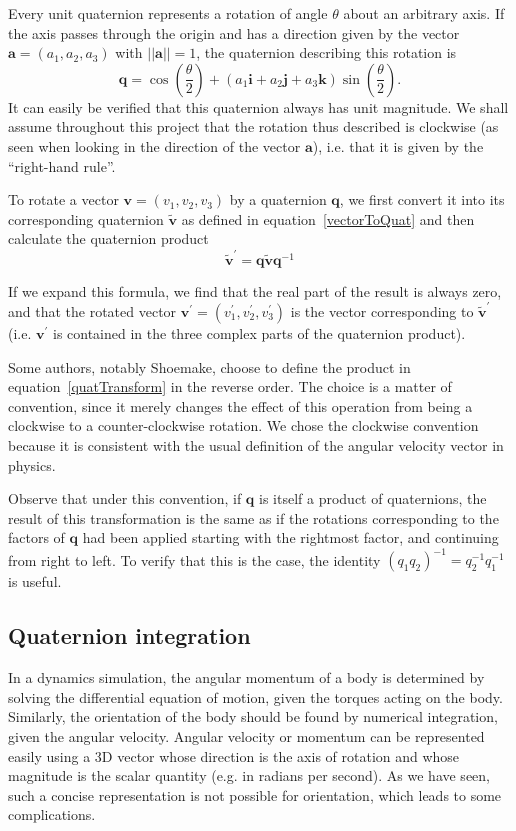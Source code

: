 Every unit quaternion represents a rotation of angle $\theta$ about an arbitrary axis.
If the axis passes through the origin and has a direction given by the vector
$\mathbf{a} = (a_1, a_2, a_3)$ with $||\mathbf{a}|| = 1$, the quaternion describing this rotation is
\begin{equation}
\label{quatRotation}
\mathbf{q} = \cos\left(\frac{\theta}{2}\right) + (a_1\mathbf{i} + a_2\mathbf{j} +
    a_3\mathbf{k}) \sin\left(\frac{\theta}{2}\right).
\end{equation}
It can easily be verified that this quaternion always has unit magnitude.
We shall assume throughout this project that the rotation thus described is clockwise (as seen
when looking in the direction of the vector $\mathbf{a}$), i.e. that it is given by the
``right-hand rule''.

To rotate a vector $\mathbf{v} = (v_1, v_2, v_3)$ by a quaternion $\mathbf{q}$, we first
convert it into its corresponding quaternion $\tilde{\mathbf{v}}$ as defined in
equation~\ref{vectorToQuat} and then calculate the quaternion product
\begin{equation}
\label{quatTransform}
\tilde{\mathbf{v}}^\prime = \mathbf{q}\tilde{\mathbf{v}}\mathbf{q}^{-1}
\end{equation}

If we expand this formula, we find that the real part of the result is always zero, and
that the rotated vector $\mathbf{v}^\prime = (v_1^\prime, v_2^\prime, v_3^\prime)$ is
the vector corresponding to $\tilde{\mathbf{v}}^\prime$ (i.e. $\mathbf{v}^\prime$ is
contained in the three complex parts of the quaternion product).

Some authors, notably Shoemake, choose to define the product in equation~\ref{quatTransform} in
the reverse order. The choice is a matter of convention, since it merely changes the effect
of this operation from being a clockwise to a counter-clockwise rotation. We chose the clockwise
convention because it is consistent with the usual definition of the angular velocity vector
in physics.

Observe that under this convention, if $\mathbf{q}$ is itself a product of quaternions, the
result of this transformation is the same as if the rotations corresponding to the factors
of $\mathbf{q}$ had been applied starting with the rightmost factor, and continuing from
right to left. To verify that this is the case, the identity
$(q_1 q_2)^{-1} = q_2^{-1} q_1^{-1}$ is useful.

\subsection{Quaternion integration}
In a dynamics simulation, the angular momentum of a body is determined by solving the
differential equation of motion, given the torques acting on the body. Similarly, the
orientation of the body should be found by numerical integration, given the angular
velocity. Angular velocity or momentum can be represented easily using a 3D vector whose
direction is the axis of rotation and whose magnitude is the scalar quantity (e.g. in
radians per second). As we have seen, such a concise representation is not possible for
orientation, which leads to some complications.

